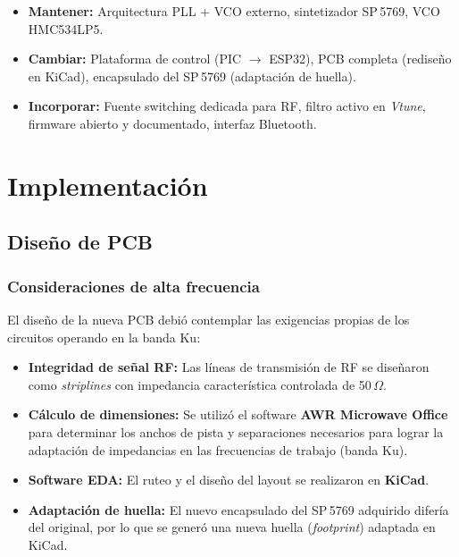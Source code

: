 \documentclass[12pt, a4paper]{article}
\begin{document}
	\begin{tcolorbox}[colback=grisClaro, colframe=azulUNT, title=\textbf{Resumen de decisiones de diseño}]
		\begin{itemize}[leftmargin=*]
			\item \textbf{Mantener:} Arquitectura PLL + VCO externo, sintetizador SP\,5769, VCO HMC534LP5.
			\item \textbf{Cambiar:} Plataforma de control (PIC $\rightarrow$ ESP32), PCB completa (rediseño en
			KiCad), encapsulado del SP\,5769 (adaptación de huella).
			\item \textbf{Incorporar:} Fuente switching dedicada para RF, filtro activo en \textit{Vtune},
			firmware abierto y documentado, interfaz Bluetooth.
		\end{itemize}
	\end{tcolorbox}
	
	\section{Implementación}
	
	\subsection{Diseño de PCB}
	
	\subsubsection{Consideraciones de alta frecuencia}
	El diseño de la nueva PCB debió contemplar las exigencias propias de los circuitos operando en la
	banda Ku:
	
	\begin{itemize}[leftmargin=*]
		\item \textbf{Integridad de señal RF:} Las líneas de transmisión de RF se diseñaron como
		\textit{striplines} con impedancia característica controlada de 50\,$\Omega$.
		\item \textbf{Cálculo de dimensiones:} Se utilizó el software \textbf{AWR Microwave Office} para
		determinar los anchos de pista y separaciones necesarios para lograr la adaptación de impedancias
		en las frecuencias de trabajo (banda Ku).
		\item \textbf{Software EDA:} El ruteo y el diseño del layout se realizaron en \textbf{KiCad}.
		\item \textbf{Adaptación de huella:} El nuevo encapsulado del SP\,5769 adquirido difería del
		original, por lo que se generó una nueva huella (\textit{footprint}) adaptada en KiCad.
	\end{itemize}
	
\end{document}
